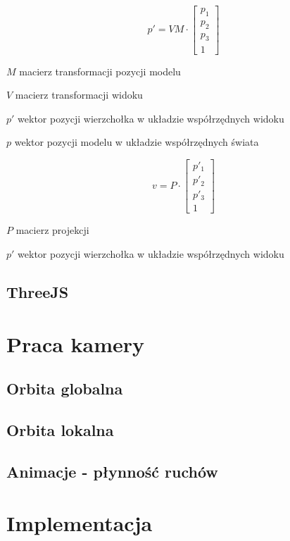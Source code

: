 \begin{equation}
    \label{eq:MV}
    p' = VM \cdot \begin{bmatrix}
        p_{1} \\
        p_{2} \\
        p_{3} \\ 
        1
      \end{bmatrix}
\end{equation}
\begin{eqexpl}[25mm]
    \item{$M$} macierz transformacji pozycji modelu
    \item{$V$} macierz transformacji widoku
    \item{$p'$} wektor pozycji wierzchołka w układzie współrzędnych widoku
    \item{$p$} wektor pozycji modelu w układzie współrzędnych świata
\end{eqexpl}

\begin{equation}
\label{eq:MVP}
    v = P \cdot \begin{bmatrix}
        p'_{1} \\
        p'_{2} \\
        p'_{3} \\ 
        1
      \end{bmatrix}
\end{equation}
\begin{eqexpl}[25mm]
    \item{$P$} macierz projekcji
    \item{$p'$} wektor pozycji wierzchołka w układzie współrzędnych widoku
\end{eqexpl}


\subsection{ThreeJS}

\section{Praca kamery}

\subsection{Orbita globalna}

\subsection{Orbita lokalna}

\subsection{Animacje - płynność ruchów}

\section{Implementacja}